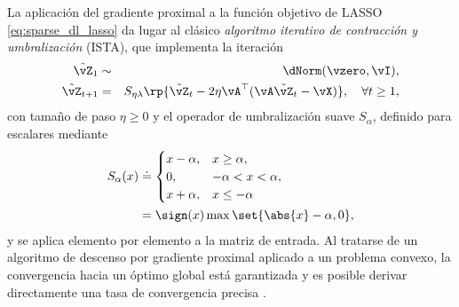 \documentclass[../../book-main.tex]{subfiles}
\begin{document}
La aplicación del gradiente proximal a la función objetivo de LASSO
\eqref{eq:sparse_dl_lasso} da lugar al clásico \textit{algoritmo iterativo
de contracción y umbralización} (ISTA), que implementa la iteración
\begin{eqnarray}
    \tilde{\vZ}_{1} &\sim& \dNorm(\vzero, \vI), \\
    \tilde{\vZ}_{t + 1} &=& S_{\eta\lambda}\rp{\tilde{\vZ}_{t} - 2\eta
    \vA^{\top}(\vA\tilde{\vZ}_{t} - \vX)}, \quad \forall t \geq
    1,\label{eq:ista_update}
\end{eqnarray}
con tamaño de paso \(\eta \geq 0\) y el operador de umbralización suave
\(S_{\alpha}\), definido para escalares mediante
\begin{align}
    S_{\alpha}(x) &
    \doteq
    \begin{cases}x - \alpha, & x \geq \alpha, \\ 0,
        & -\alpha < x < \alpha, \\ x + \alpha, & x \leq -\alpha
    \end{cases}
    \\
    &=
    \sign(x) \max \set{\abs{x} - \alpha, 0},
\end{align}
y se aplica elemento por elemento a la matriz de entrada. Al tratarse de un 
algoritmo de descenso por gradiente proximal aplicado a un problema convexo, 
la convergencia hacia un óptimo global está garantizada y es posible derivar 
directamente una tasa de convergencia precisa \cite{Wright-Ma-2022}.
\end{document}
